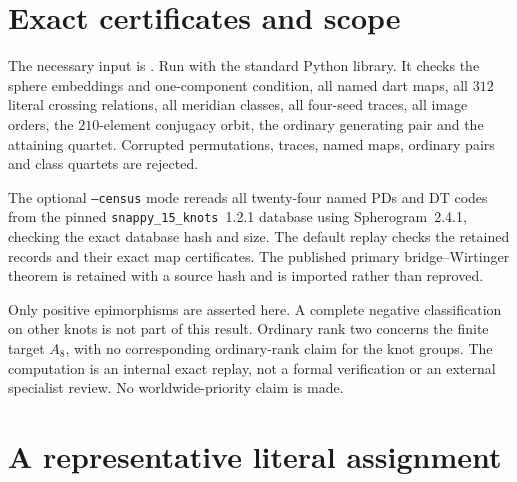 \documentclass[11pt]{article}
\begin{document}
\section{Exact certificates and scope}

The necessary input is . Run
 with the standard Python library.
It checks the sphere embeddings and one-component condition, all
named dart maps, all $312$ literal crossing relations, all meridian
classes, all four-seed traces, all image orders, the $210$-element
conjugacy orbit, the ordinary generating pair and the attaining
quartet. Corrupted permutations, traces, named maps, ordinary pairs
and class quartets are rejected.

The optional \texttt{--census} mode rereads all twenty-four named PDs
and DT codes from the pinned \texttt{snappy\_15\_knots}~1.2.1 database
using Spherogram~2.4.1, checking the exact database hash and size.
The default replay checks the retained records and their exact map
certificates. The published primary bridge--Wirtinger theorem is
retained with a source hash and is imported rather than reproved.

Only positive epimorphisms are asserted here. A complete negative
classification on other knots is not part of this result. Ordinary
rank two concerns the finite target $A_8$, with no corresponding
ordinary-rank claim for the knot groups. The computation is an internal
exact replay, not a formal verification or an external specialist
review. No worldwide-priority claim is made.

\section{A representative literal assignment}
\end{document}
